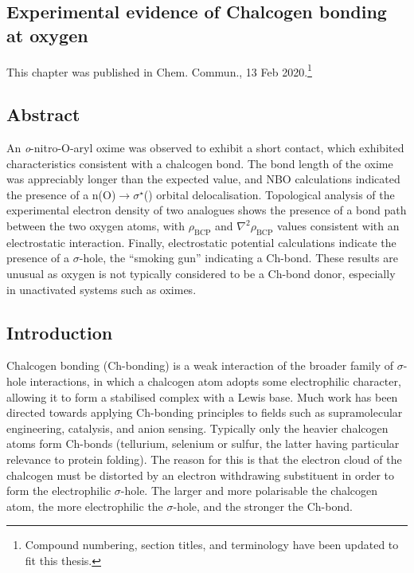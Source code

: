 \begin{refsection}

\chapter{Experimental evidence of Chalcogen bonding at oxygen}\label{ch:o-ch-bonding}

This chapter was published in Chem. Commun., 13 Feb 2020\autocite{Fellowes2020}.\footnote{Compound numbering, section titles, and terminology have been updated to fit this thesis.}

\section{Abstract}
An \emph{o}-nitro-O-aryl oxime was observed to exhibit a short  contact, which exhibited characteristics consistent with a chalcogen bond.
The  bond length of the oxime was appreciably longer than the expected value, and
NBO calculations indicated the presence of a n(O)$\rightarrow \sigma^{\star}$() orbital delocalisation.
Topological analysis of the experimental electron density of two analogues shows the presence of a bond path between the two oxygen atoms, with $\rho_\text{BCP}$ and $\nabla^{2}\rho_\text{BCP}$ values consistent with an electrostatic interaction.
Finally, electrostatic potential calculations indicate the presence of a $\sigma$-hole, the ``smoking gun'' indicating a Ch-bond.
These results are unusual as oxygen is not typically considered to be a Ch-bond donor, especially in unactivated systems such as oximes.

\section{Introduction}
Chalcogen bonding (Ch-bonding) is a weak interaction of the broader family of $\sigma$-hole interactions, in which a chalcogen atom adopts some electrophilic character, allowing it to form a stabilised complex with a Lewis base.
Much work has been directed towards applying Ch-bonding principles to fields such as supramolecular engineering, catalysis, and anion sensing.\autocite{Riwar2018,Mahmudov2017,Wonner2019,Ho2016,Kremer2016,Benz2017a}
Typically only the heavier chalcogen atoms form Ch-bonds (tellurium, selenium or sulfur, the latter having particular relevance to protein folding).\autocite{Iwaoka2012}
The reason for this is that the electron cloud of the chalcogen must be distorted by an electron withdrawing substituent in order to form the electrophilic $\sigma$-hole.
The larger and more polarisable the chalcogen atom, the more electrophilic the $\sigma$-hole, and the stronger the Ch-bond.\autocite{Murray2008}


\end{refsection}

